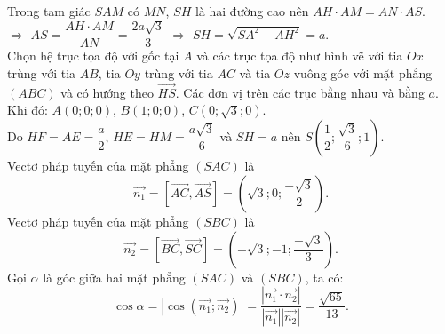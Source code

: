 \begin{ex}
{{
		}
		Trong tam giác $SAM$ có $MN$, $SH$ là hai đường cao nên $AH\cdot AM=AN\cdot AS$.\\
		$\Rightarrow$ $AS=\dfrac{AH\cdot AM}{AN}=\dfrac{2a\sqrt{3}}{3}$
		$\Rightarrow$ $SH=\sqrt{SA^2-AH^2}=a$.\\
		Chọn hệ trục tọa độ với gốc tại $A$ và các trục tọa độ như hình vẽ với tia $Ox$ trùng với tia $AB$, tia $Oy$ trùng với tia $AC$ và tia $Oz$ vuông góc với mặt phẳng $(ABC)$ và có hướng theo $\vec{HS}$. Các đơn vị trên các trục bằng nhau và bằng $a$.\\
		Khi đó: $A(0;0;0)$, $B(1;0;0)$, $C(0;\sqrt{3};0)$.\\
		Do $HF=AE=\dfrac{a}{2}$, $HE=HM=\dfrac{a\sqrt{3}}{6}$ và $SH=a$ nên $S\left(\dfrac{1}{2};\dfrac{\sqrt{3}}{6};1\right)$.\\
		Vectơ pháp tuyến của mặt phẳng $(SAC)$ là $$\vec{n_1}=[\vec{AC},\vec{AS}]=\left(\sqrt{3};0;\dfrac{-\sqrt{3}}{2}\right).$$
		Vectơ pháp tuyến của mặt phẳng $(SBC)$ là $$\vec{n_2}=[\vec{BC},\vec{SC}]=\left(-\sqrt{3};-1;\dfrac{-\sqrt{3}}{3}\right).$$
		Gọi $\alpha$ là góc giữa hai mặt phẳng $(SAC)$ và $(SBC)$, ta có: $$\cos \alpha=|\cos (\vec{n_1};\vec{n_2})|=\dfrac{|\vec{n_1}\cdot\vec{n_2}|}{|\vec{n_1}||\vec{n_2}|}=\dfrac{\sqrt{65}}{13}.$$
	}
\end{ex}
